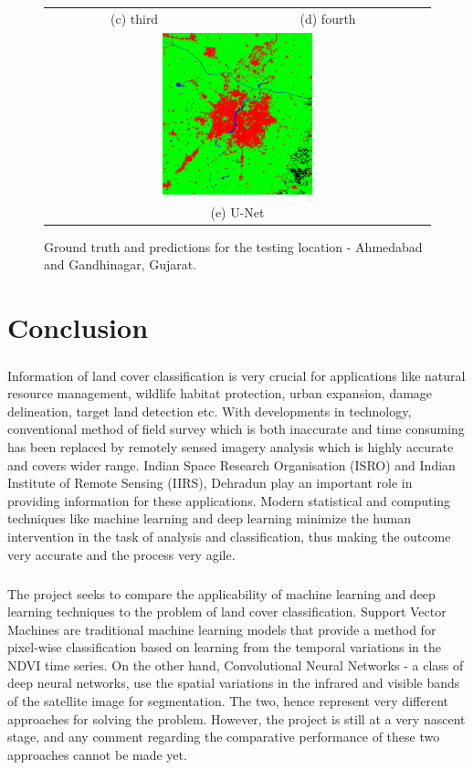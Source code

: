 \documentclass[12pt, a4paper]{report}
\begin{document}
\begin{figure}
\begin{center}
\begin{tabular}{cc}
(c) third & (d) fourth \\[6pt]
\multicolumn{2}{c}{\includegraphics[width=0.4\textwidth]{test_cnn} }\\
\multicolumn{2}{c}{(e) U-Net}
\end{tabular}
\caption{Ground truth and predictions for the testing location - Ahmedabad and Gandhinagar, Gujarat.}
\end{center}
\end{figure}

\chapter{Conclusion}

\paragraph{}
Information of land cover classification is very crucial for applications like natural resource management, wildlife habitat protection, urban expansion, damage delineation, target land detection etc. With developments in technology, conventional method of field survey which is both inaccurate and time consuming has been replaced by remotely sensed imagery analysis which is highly accurate and covers wider range. Indian Space Research Organisation (ISRO) and Indian Institute of Remote Sensing (IIRS), Dehradun play an important role in providing information for these applications. Modern statistical and computing techniques like machine learning and deep learning minimize the human intervention in the task of analysis and classification, thus making the outcome very accurate and the process very agile.
\paragraph{}
The project seeks to compare the applicability of machine learning and deep learning techniques to the problem of land cover classification. Support Vector Machines are traditional machine learning models that provide a method for pixel-wise classification based on learning from the temporal variations in the NDVI time series. On the other hand, Convolutional Neural Networks - a class of deep neural networks, use the spatial variations in the infrared and visible bands of the satellite image for segmentation. The two, hence represent very different approaches for solving the problem. However, the project is still at a very nascent stage, and any comment regarding the comparative performance of these two approaches cannot be made yet.
\end{document}
